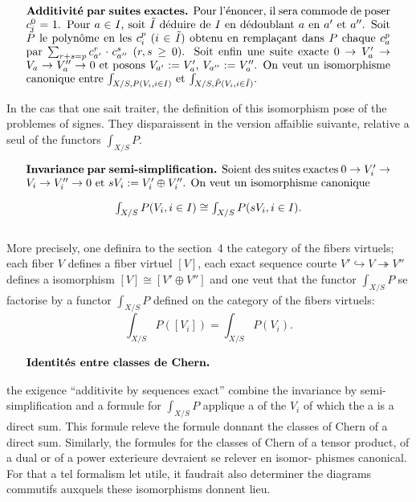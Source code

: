 \documentclass[12pt,a4paper]{article}
\theoremstyle{plain}
\theoremstyle{definition}
\begin{document}
\begin{equation}\label{eq:2.1.6}
\parbox{\dimexpr\linewidth-2em}{%
\textbf{Additivit\'e par suites exactes.} Pour l'\'enoncer, il sera commode de poser
$c_i^0 = 1$. Pour $a \in I$, soit $\tilde{I}$ d\'eduire de $I$ en d\'edoublant $a$ en $a'$ et $a''$.
Soit $\tilde{P}$ le polyn\^ome en les $c_i^p$ ($i \in \tilde{I}$) obtenu en rempla\c{c}ant dans $P$ chaque
$c_a^p$ par $\sum_{r+s=p} c_{a'}^r \cdot c_{a''}^s$ ($r,s \geq 0$). Soit enfin une suite exacte
$0 \to V_a' \to V_a \to V_a'' \to 0$
et posons $V_{a'} := V_a'$, $V_{a''} := V_a''$. On veut un isomorphisme canonique entre
$\int_{X/S, P(V_i, i \in I)}$ et $\int_{X/S, \tilde{P}(V_i, i \in \tilde{I})}$.}
\end{equation}

In the cas that one sait traiter, the definition of this isomorphism pose of the
problemes of signes. They disparaissent in the version affaiblie suivante, relative
a seul of the functors $\int_{X/S} P$.

\begin{equation}\label{eq:2.1.7}
\parbox{\dimexpr\linewidth-2em}{%
\textbf{Invariance par semi-simplification.} Soient des suites exactes $0 \to V_i' \to
V_i \to V_i'' \to 0$ et $sV_i := V_i' \oplus V_i''$. On veut un isomorphisme canonique
\[
\textstyle \int_{X/S} P(V_i, i \in I) \cong \int_{X/S} P(sV_i, i \in I) .
\]}
\end{equation}

More precisely, one definira to the section~4 the category of the fibers virtuels;
each fiber $V$ defines a fiber virtuel $[V]$, each exact sequence courte $V' \hookrightarrow
V \twoheadrightarrow V''$ defines a isomorphism $[V] \cong [V' \oplus V'']$ and one veut that the functor $\int_{X/S} P$
se factorise by a functor $\int_{X/S} P$ defined on the category of the fibers virtuels:
\[
\textstyle \int_{X/S} P([V_i]) = \int_{X/S} P(V_i) .
\]

\begin{equation}\label{eq:2.1.8}
\parbox{\dimexpr\linewidth-2em}{%
\textbf{Identit\'es entre classes de Chern.}}
\end{equation}

the exigence ``additivite by sequences exact'' combine the invariance by semi-
simplification and a formule for $\int_{X/S} P$ applique a of the $V_i$ of which the a is
a direct sum. This formule releve the formule donnant the classes of Chern
of a direct sum. Similarly, the formules for the classes of Chern of a tensor product, of a dual or of a power exterieure devraient se relever en isomor-
phismes canonical. For that a tel formalism let utile, it faudrait also
determiner the diagrams commutifs auxquels these isomorphisms donnent lieu.
\end{document}
